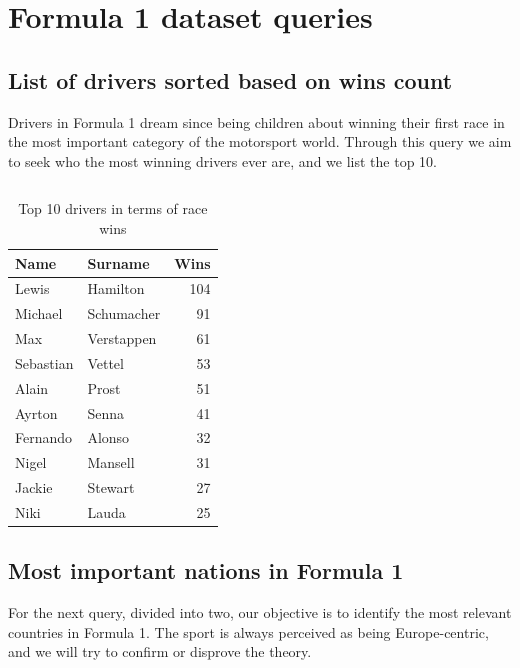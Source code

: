 \documentclass{Configuration_Files/PoliMi3i_thesis}
\begin{document}
\section{Formula 1 dataset queries}
\subsection{List of drivers sorted based on wins count}
Drivers in Formula 1 dream since being children about winning their first race in the most important category of the motorsport world.
Through this query we aim to seek who the most winning drivers ever are, and we list the top 10. 

\vspace{0.5cm}
\inputminted[frame=single,framesep=10pt,breaklines]{python}{formula1/queries/query1.py}

\newpage
\begin{table}[!h]
    \centering
    \begin{tabular}{|l|l|r|}
        \hline
        \textbf{Name} & \textbf{Surname} & \textbf{Wins} \\
        \hline
        Lewis & Hamilton & 104 \\
        Michael & Schumacher & 91 \\
        Max & Verstappen & 61 \\
        Sebastian & Vettel & 53 \\
        Alain & Prost & 51 \\
        Ayrton & Senna & 41 \\
        Fernando & Alonso & 32 \\
        Nigel & Mansell & 31 \\
        Jackie & Stewart & 27 \\
        Niki & Lauda & 25 \\
        \hline
    \end{tabular}
    \caption{Top 10 drivers in terms of race wins}
\end{table}


\subsection{Most important nations in Formula 1}
For the next query, divided into two, our objective is to identify the most relevant countries in Formula 1. The sport is always perceived as being Europe-centric, and we will try to confirm or disprove the theory.

\vspace{0.5cm}
\inputminted[frame=single,framesep=10pt,breaklines]{python}{formula1/queries/query2.py}
\end{document}
